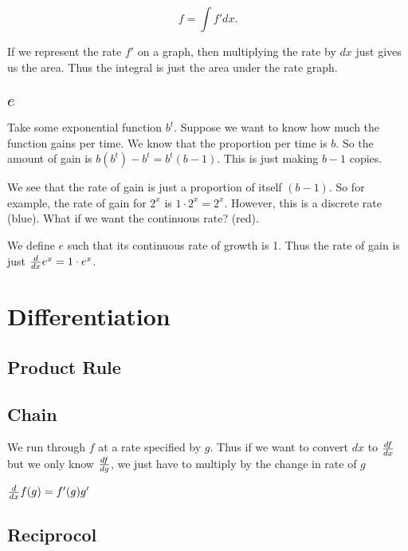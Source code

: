 \documentclass[../main.tex]{subfiles}
\begin{document}
\[ f = \int f' dx. \]



If we represent the rate \( f' \) on a graph,
then multiplying the rate by \( dx \) just gives us the area.
Thus the integral is just the area under the rate graph.




\subsection{\( e \)}

Take some exponential function \( b^t \).
Suppose we want to know how much the function gains per time.
We know that the proportion per time is \( b \).
So the amount of gain is \( b(b^{t}) - b^t = b^t (b - 1) \).
This is just making \( b - 1 \) copies.



We see that the rate of gain is just a proportion of itself \( (b - 1) \).
So for example, the rate of gain for \( 2^x \) is \( 1 \cdot 2^x = 2^x \).
However, this is a discrete rate (blue).
What if we want the continuous rate? (red).

We define \( e \) such that its continuous rate of growth is 1.
Thus the rate of gain is just \( \dv{x} e^x = 1 \cdot e^x \).


\newpage
\section{Differentiation}


\subsection{Product Rule}



\subsection{Chain}

We run through \( f \) at a rate specified by \( g \).
Thus if we want to convert \( dx \) to \( \dv{f}{x} \)
but we only know \( \dv{f}{g} \),
we just have to multiply by the change in rate of \( g \)



\( \dv{x} f(g) = f'(g)g' \)

\subsection{Reciprocol}
\end{document}
